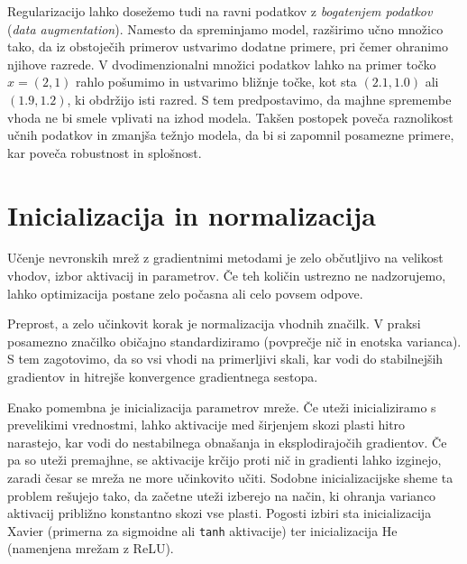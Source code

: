 Regularizacijo lahko dosežemo tudi na ravni podatkov z \emph{bogatenjem podatkov} ({\em data augmentation}). Namesto da spreminjamo model, razširimo učno množico tako, da iz obstoječih primerov ustvarimo dodatne primere, pri čemer ohranimo njihove razrede. V dvodimenzionalni množici podatkov lahko na primer točko \(x = (2,1)\) rahlo pošumimo in ustvarimo bližnje točke, kot sta \((2.1, 1.0)\) ali \((1.9, 1.2)\), ki obdržijo isti razred. S tem predpostavimo, da majhne spremembe vhoda ne bi smele vplivati na izhod modela. Takšen postopek poveča raznolikost učnih podatkov in zmanjša težnjo modela, da bi si zapomnil posamezne primere, kar poveča robustnost in splošnost.

\section{Inicializacija in normalizacija}

Učenje nevronskih mrež z gradientnimi metodami je zelo občutljivo na velikost vhodov, izbor aktivacij in parametrov. Če teh količin ustrezno ne nadzorujemo, lahko optimizacija postane zelo počasna ali celo povsem odpove.

Preprost, a zelo učinkovit korak je normalizacija vhodnih značilk. V praksi posamezno značilko običajno standardiziramo (povprečje nič in enotska varianca). S tem zagotovimo, da so vsi vhodi na primerljivi skali, kar vodi do stabilnejših gradientov in hitrejše konvergence gradientnega sestopa.

Enako pomembna je inicializacija parametrov mreže. Če uteži inicializiramo s prevelikimi vrednostmi, lahko aktivacije med širjenjem skozi plasti hitro narastejo, kar vodi do nestabilnega obnašanja in eksplodirajočih gradientov. Če pa so uteži premajhne, se aktivacije krčijo proti nič in gradienti lahko izginejo, zaradi česar se mreža ne more učinkovito učiti. Sodobne inicializacijske sheme ta problem rešujejo tako, da začetne uteži izberejo na način, ki ohranja varianco aktivacij približno konstantno skozi vse plasti. Pogosti izbiri
%
%
sta inicializacija Xavier (primerna za sigmoidne ali \texttt{tanh} aktivacije) ter inicializacija He (namenjena mrežam z ReLU).

